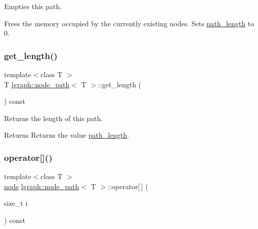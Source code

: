 Empties this path. 

Frees the memory occupied by the currently existing nodes. Sets \hyperlink{classlgraph_1_1node__path_a3461f9839615e5bc4837d24438117f16}{path\+\_\+length} to 0. \mbox{\label{classlgraph_1_1node__path_af87f77447320eadcd98e08a76d7e1f58}} 
\subsubsection{\texorpdfstring{get\+\_\+length()}{get\_length()}}
{\footnotesize\ttfamily template$<$class T $>$ \\
T \hyperlink{classlgraph_1_1node__path}{lgraph\+::node\+\_\+path}$<$ T $>$\+::get\+\_\+length (\begin{DoxyParamCaption}{ }\end{DoxyParamCaption}) const}



Returns the length of this path. 

\begin{DoxyReturn}{Returns}
Returns the value \hyperlink{classlgraph_1_1node__path_a3461f9839615e5bc4837d24438117f16}{path\+\_\+length}. 
\end{DoxyReturn}
\mbox{\label{classlgraph_1_1node__path_acdb1f0e23258673d2db5aef6e623ee4f}} 
\subsubsection{\texorpdfstring{operator[]()}{operator[]()}\hspace{0.1cm}{\footnotesize\ttfamily [1/2]}}
{\footnotesize\ttfamily template$<$class T $>$ \\
\hyperlink{namespacelgraph_a397169dd66adf725210a30fb7251773e}{node} \hyperlink{classlgraph_1_1node__path}{lgraph\+::node\+\_\+path}$<$ T $>$\+::operator\mbox{[}$\,$\mbox{]} (\begin{DoxyParamCaption}\item[{size\+\_\+t}]{i }\end{DoxyParamCaption}) const}



